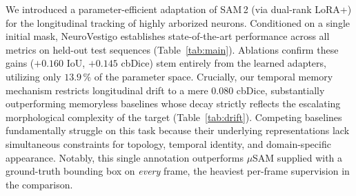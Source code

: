 \documentclass[11pt,a4paper]{article}
\begin{document}
We introduced a parameter-efficient adaptation of SAM\,2 (via dual-rank
LoRA+) for the longitudinal tracking of highly arborized neurons.
Conditioned on a single initial mask, NeuroVestigo establishes
state-of-the-art performance across all metrics on held-out test
sequences (Table~\ref{tab:main}). Ablations confirm these gains ($+0.160$
IoU, $+0.145$ cbDice) stem entirely from the learned adapters, utilizing
only $13.9\,\%$ of the parameter space. Crucially, our temporal memory
mechanism restricts longitudinal drift to a mere $0.080$ cbDice,
substantially outperforming memoryless baselines whose decay strictly
reflects the escalating morphological complexity of the target
(Table~\ref{tab:drift}). Competing baselines fundamentally struggle on this
task because their underlying representations lack simultaneous constraints
for topology, temporal identity, and domain-specific appearance. Notably, this single
annotation outperforms $\mu$SAM supplied with a ground-truth bounding box on
\emph{every} frame, the heaviest per-frame supervision in the comparison.
\end{document}
